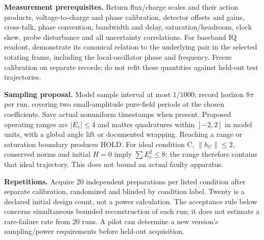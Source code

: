\documentclass[10pt,a4paper]{article}
\begin{document}
\textbf{Measurement prerequisites.} Return flux/charge scales and their action products, voltage-to-charge and phase calibration, detector offsets and gains, cross-talk, phase convention, bandwidth and delay, saturation/headroom, clock skew, probe disturbance and all uncertainty correlations. For baseband IQ readout, demonstrate its canonical relation to the underlying pair in the selected rotating frame, including the local-oscillator phase and frequency. Freeze calibration on separate records; do not refit these quantities against held-out test trajectories.

\textbf{Sampling proposal.} Model sample interval at most $1/1000$; record horizon $8\pi$ per run, covering two small-amplitude pure-field periods at the chosen coefficients. Save actual nonuniform timestamps when present. Proposed operating ranges are $|E_e|\le4$ and matter quadratures within $[-2,2]$ in model units, with a global angle lift or documented wrapping. Reaching a range or saturation boundary produces HOLD. For ideal condition C, $\|h_U\|\le2$, conserved norms and initial $H=0$ imply $\sum E_e^2\le8$; the range therefore contains that ideal trajectory. This does not bound an actual faulty apparatus.

\textbf{Repetitions.} Acquire 20 independent preparations per listed condition after separate calibration, randomized and blinded by condition label. Twenty is a declared initial design count, not a power calculation. The acceptance rule below concerns simultaneous bounded reconstruction of each run; it does not estimate a rare-failure rate from 20 runs. A pilot can determine a new version's sampling/power requirements before held-out acquisition.

\newpage
\end{document}
